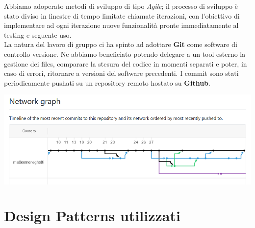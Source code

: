 \documentclass[a4paper]{report}
\begin{document}
        Abbiamo adoperato metodi di sviluppo di tipo \textit{Agile}; il processo di sviluppo \`e stato diviso in finestre di tempo limitate chiamate iterazioni, con l'obiettivo di implementare ad ogni iterazione nuove funzionalit\`a pronte immediatamente al testing e seguente uso.\\
        
        La natura del lavoro di gruppo ci ha spinto ad adottare \textbf{Git} come software di controllo versione. Ne abbiamo beneficiato potendo delegare a un tool esterno la gestione dei files, comparare la stesura del codice in momenti separati e poter, in caso di errori, ritornare a versioni del software precedenti.
        I commit sono stati periodicamente pushati su un repository remoto hostato su \textbf{Github}.
        \begin{center}
                    \includegraphics[scale=0.7]{immaginiVarie/networkGraph.png}
        \end{center}
        
        
    \section{Design Patterns utilizzati}
\end{document}

